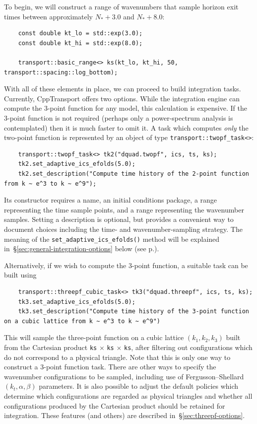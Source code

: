 \documentclass[11pt,a4paper]{article}
\newcommand{\Nstar}{N_{\ast}}
\newcommand{\packagefont}{\sffamily}
\newcommand{\CppTransport}{{\packagefont CppTransport}}
\newcommand{\semibold}[1]{{\fontseries{b}\selectfont{#1}}}
\newcommand{\para}[1]{\par\vspace{2mm}\noindent\semibold{{#1.}---}\ignorespaces}
\begin{document}
To begin, we will construct a range of wavenumbers that
sample horizon exit times between approximately
$\Nstar + 3.0$
and
$\Nstar + 8.0$:
\begin{verbatim}
    const double kt_lo = std::exp(3.0);
    const double kt_hi = std::exp(8.0);

    transport::basic_range<> ks(kt_lo, kt_hi, 50, transport::spacing::log_bottom);
\end{verbatim}

\para{Building 2- and 3-point function integration tasks}
With all of these elements in place, we can proceed to build
integration tasks.
Currently, {\CppTransport} offers two options.
While the integration
engine can compute the 3-point function for any model,
this calculation is expensive.
If the 3-point function is not required
(perhaps only a power-spectrum analysis is contemplated)
then it is much faster to omit it.
A task which computes \emph{only} the two-point function
is represented by an object of type
\texttt{transport::twopf_task<>}:
\begin{verbatim}
    transport::twopf_task<> tk2("dquad.twopf", ics, ts, ks);
    tk2.set_adaptive_ics_efolds(5.0);
    tk2.set_description("Compute time history of the 2-point function from k ~ e^3 to k ~ e^9");
\end{verbatim}
Its constructor requires a name, an initial conditions package,
a range representing the time sample points,
and a range representing the wavenumber samples.
Setting a description is optional, but provides a convenient way to document
choices including the time- and wavenumber-sampling strategy.
The meaning of the
\texttt{set_adaptive_ics_efolds()}
method will be explained in~\S\ref{sec:general-integration-options} below
(see p.\pageref{enum:adpative-ics}).

Alternatively, if we wish to compute the 3-point function,
a suitable task can be built using
\begin{verbatim}
    transport::threepf_cubic_task<> tk3("dquad.threepf", ics, ts, ks);
    tk3.set_adaptive_ics_efolds(5.0);
    tk3.set_description("Compute time history of the 3-point function on a cubic lattice from k ~ e^3 to k ~ e^9")
\end{verbatim}
This will sample the three-point function on a cubic lattice
$(k_1, k_2, k_3)$ built from the Cartesian product
\texttt{ks} $\times$
\texttt{ks} $\times$
\texttt{ks},
after filtering out configurations which do not correspond to
a physical triangle.
Note that
this is only one way to construct a 3-point function task.
There are other ways to specify the wavenumber configurations
to be sampled, including use of
Fergusson--Shellard $(k_t, \alpha, \beta)$ parameters.
It is also possible to adjust the default
policies which determine which configurations
are regarded as physical triangles and whether all
configurations produced by the Cartesian product should
be retained for integration.
These features (and others) are described in~\S\ref{sec:threepf-options}.
\end{document}
